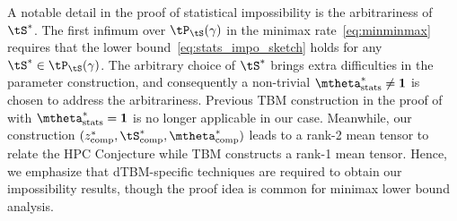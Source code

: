 \documentclass[lettersize,onecolumn,journal]{IEEEtran}
\theoremstyle{definition}
\theoremstyle{definition}
\begin{document}
{A notable detail in the proof of statistical impossibility is the arbitrariness of $\tS^*$. The first infimum over $ \tP_{\tS}(\gamma)$ in the minimax rate~\eqref{eq:minminmax} requires that the lower bound~\eqref{eq:stats_impo_sketch} holds for any $\tS^* \in \tP_{\tS}(\gamma)$. The arbitrary choice of $\tS^*$ brings extra difficulties in the parameter construction, and consequently a non-trivial $\mtheta^*_{\rm stats} \neq \mathbf{1}$ is chosen to address the arbitrariness. Previous TBM construction in the proof of \citet[Theorem 6]{han2020exact} with $\mtheta^*_{\rm stats} = \mathbf{1}$ is no longer applicable in our case. Meanwhile, our construction $(z^*_{\rm comp}, \tS^*_{\rm comp}, \mtheta^*_{\rm comp})$ leads to a rank-2 mean tensor to relate the HPC Conjecture while TBM \citet[Theorem 7]{han2020exact} constructs a rank-1 mean tensor. Hence, we emphasize that dTBM-specific techniques are required to obtain our impossibility results, though the proof idea is common for minimax lower bound analysis. 

}
\end{document}
